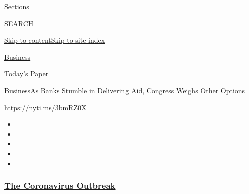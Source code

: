 Sections

SEARCH

\protect\hyperlink{site-content}{Skip to
content}\protect\hyperlink{site-index}{Skip to site index}

\href{https://www.nytimes3xbfgragh.onion/section/business}{Business}

\href{https://myaccount.nytimes3xbfgragh.onion/auth/login?response_type=cookie\&client_id=vi}{}

\href{https://www.nytimes3xbfgragh.onion/section/todayspaper}{Today's
Paper}

\href{/section/business}{Business}\textbar{}As Banks Stumble in
Delivering Aid, Congress Weighs Other Options

\url{https://nyti.ms/3bmRZ0X}

\begin{itemize}
\item
\item
\item
\item
\item
\end{itemize}

\hypertarget{the-coronavirus-outbreak}{%
\subsubsection{\texorpdfstring{\href{https://www.nytimes3xbfgragh.onion/news-event/coronavirus?name=styln-coronavirus-markets\&region=TOP_BANNER\&block=storyline_menu_recirc\&action=click\&pgtype=Article\&impression_id=ae7ae740-f27f-11ea-8789-45ae9f4c38e2\&variant=undefined}{The
Coronavirus
Outbreak}}{The Coronavirus Outbreak}}\label{the-coronavirus-outbreak}}

